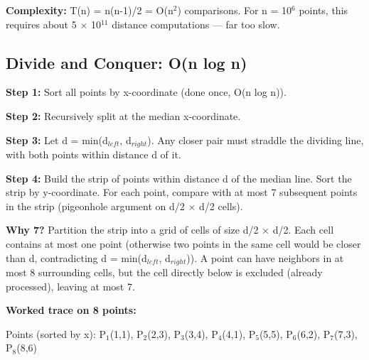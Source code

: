 \textbf{Complexity:} T(n) = n(n-1)/2 = O(n$^{2}$) comparisons. For n = 10$^{6}$ points, this requires about 5 $\times$ 10$^{11}$ distance computations --- far too slow.

\subsection{Divide and Conquer: O(n log n)}

\textbf{Step 1:} Sort all points by x-coordinate (done once, O(n log n)).

\textbf{Step 2:} Recursively split at the median x-coordinate.

\textbf{Step 3:} Let d = min(d$_{left}$, d$_{right}$). Any closer pair must straddle the dividing line, with both points within distance d of it.

\textbf{Step 4:} Build the strip of points within distance d of the median line. Sort the strip by y-coordinate. For each point, compare with at most 7 subsequent points in the strip (pigeonhole argument on d/2 $\times$ d/2 cells).

\textbf{Why 7?} Partition the strip into a grid of cells of size d/2 $\times$ d/2. Each cell contains at most one point (otherwise two points in the same cell would be closer than d, contradicting d = min(d$_{left}$, d$_{right}$)). A point can have neighbors in at most 8 surrounding cells, but the cell directly below is excluded (already processed), leaving at most 7.

\textbf{Worked trace on 8 points:}

Points (sorted by x): P$_{1}$(1,1), P$_{2}$(2,3), P$_{3}$(3,4), P$_{4}$(4,1), P$_{5}$(5,5), P$_{6}$(6,2), P$_{7}$(7,3), P$_{8}$(8,6)

